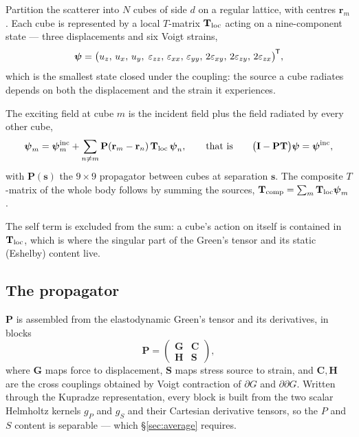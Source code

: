 \documentclass[11pt,a4paper]{article}
\newcommand{\bI}{\mathbf{I}}
\newcommand{\bP}{\mathbf{P}}
\newcommand{\bT}{\mathbf{T}}
\newcommand{\bG}{\mathbf{G}}
\newcommand{\bs}{\mathbf{s}}
\newcommand{\br}{\mathbf{r}}
\newcommand{\bpsi}{\boldsymbol{\psi}}
\newcommand{\tp}{^{\mkern-1.5mu\mathsf{T}}}
\begin{document}
Partition the scatterer into $N$ cubes of side $d$ on a regular lattice, with
centres $\br_m$.  Each cube is represented by a local $T$-matrix $\bT_{\rm loc}$
acting on a nine-component state --- three displacements and six Voigt strains,
\begin{equation}
  \bpsi = \big(u_z,\,u_x,\,u_y,\;\varepsilon_{zz},\,\varepsilon_{xx},\,
               \varepsilon_{yy},\,2\varepsilon_{xy},\,2\varepsilon_{zy},\,
               2\varepsilon_{zx}\big)\tp,
\end{equation}
which is the smallest state closed under the coupling: the source a cube
radiates depends on both the displacement and the strain it experiences.

The exciting field at cube $m$ is the incident field plus the field radiated by
every other cube,
\begin{equation}\label{eq:foldy}
  \bpsi_m = \bpsi^{\rm inc}_m + \sum_{n\neq m} \bP(\br_m-\br_n)\,\bT_{\rm loc}\,\bpsi_n,
  \qquad\text{that is}\qquad
  \big(\bI - \bP\bT\big)\bpsi = \bpsi^{\rm inc},
\end{equation}
with $\bP(\bs)$ the $9\times9$ propagator between cubes at separation $\bs$.
The composite $T$-matrix of the whole body follows by summing the sources,
$\bT_{\rm comp} = \sum_m \bT_{\rm loc}\bpsi_m$.

The self term is excluded from the sum: a cube's action on itself is contained
in $\bT_{\rm loc}$, which is where the singular part of the Green's tensor and
its static (Eshelby) content live.

\subsection{The propagator}

$\bP$ is assembled from the elastodynamic Green's tensor and its derivatives,
in blocks
\begin{equation}\label{eq:Pblocks}
  \bP = \begin{pmatrix} \bG & \mathbf{C}\\[2pt] \mathbf{H} & \mathbf{S}\end{pmatrix},
\end{equation}
where $\bG$ maps force to displacement, $\mathbf{S}$ maps stress source to
strain, and $\mathbf{C},\mathbf{H}$ are the cross couplings obtained by Voigt
contraction of $\partial G$ and $\partial\partial G$.  Written through the
Kupradze representation, every block is built from the two scalar Helmholtz
kernels $g_P$ and $g_S$ and their Cartesian derivative tensors, so the $P$ and
$S$ content is separable --- which \S\ref{sec:average} requires.
\end{document}
